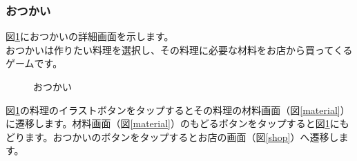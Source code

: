 \documentclass[a4j]{jarticle}
\begin{document}
\subsubsection{おつかい}
図\ref{otukai1}におつかいの詳細画面を示します。\\
おつかいは作りたい料理を選択し、その料理に必要な材料をお店から買ってくるゲームです。\\

\begin{figure}[H]
    \begin{center}
    \caption {おつかい}
    \label{otukai1}
    \end{center}
\end{figure}

図\ref{otukai1}の料理のイラストボタンをタップするとその料理の材料画面（図\ref{material}）に遷移します。材料画面（図\ref{material}）のもどるボタンをタップすると図\ref{otukai1}にもどります。おつかいのボタンをタップするとお店の画面（図\ref{shop}）へ遷移します。
\end{document}
